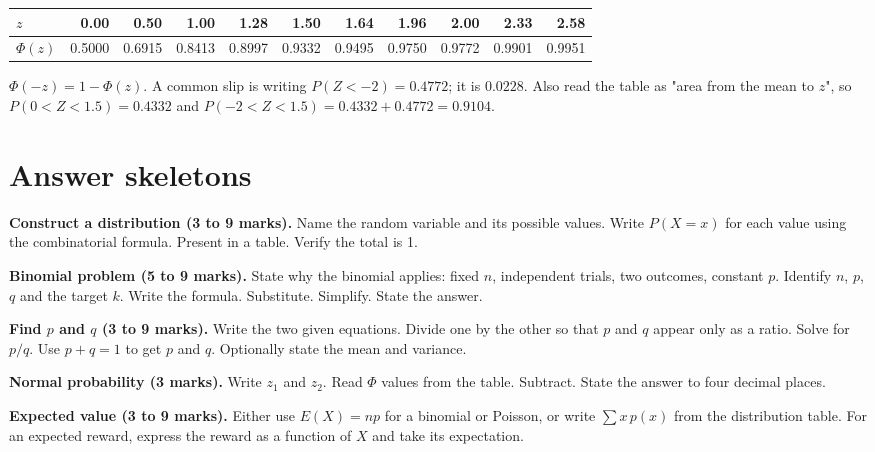 \documentclass[11pt,a4paper]{article}
\begin{document}
\begin{center}\small
\begin{tabular}{l|rrrrrrrrrr}
\toprule $z$ & 0.00 & 0.50 & 1.00 & 1.28 & 1.50 & 1.64 & 1.96 & 2.00 & 2.33 & 2.58\\\midrule
$\Phi(z)$ & 0.5000 & 0.6915 & 0.8413 & 0.8997 & 0.9332 & 0.9495 & 0.9750 & 0.9772 & 0.9901 & 0.9951\\\bottomrule
\end{tabular}
\end{center}

\begin{dangerbox}
$\Phi(-z)=1-\Phi(z)$. A common slip is writing $P(Z<-2)=0.4772$; it is $0.0228$. Also read the table as "area from the mean to $z$", so $P(0<Z<1.5)=0.4332$ and $P(-2<Z<1.5)=0.4332+0.4772=0.9104$.
\end{dangerbox}

\section{Answer skeletons}

\begin{answerbox}
\textbf{Construct a distribution (3 to 9 marks).} Name the random variable and its possible values. Write $P(X=x)$ for each value using the combinatorial formula. Present in a table. Verify the total is 1.
\end{answerbox}

\begin{answerbox}
\textbf{Binomial problem (5 to 9 marks).} State why the binomial applies: fixed $n$, independent trials, two outcomes, constant $p$. Identify $n$, $p$, $q$ and the target $k$. Write the formula. Substitute. Simplify. State the answer.
\end{answerbox}

\begin{answerbox}
\textbf{Find $p$ and $q$ (3 to 9 marks).} Write the two given equations. Divide one by the other so that $p$ and $q$ appear only as a ratio. Solve for $p/q$. Use $p+q=1$ to get $p$ and $q$. Optionally state the mean and variance.
\end{answerbox}

\begin{answerbox}
\textbf{Normal probability (3 marks).} Write $z_1$ and $z_2$. Read $\Phi$ values from the table. Subtract. State the answer to four decimal places.
\end{answerbox}

\begin{answerbox}
\textbf{Expected value (3 to 9 marks).} Either use $E(X)=np$ for a binomial or Poisson, or write $\sum x\,p(x)$ from the distribution table. For an expected reward, express the reward as a function of $X$ and take its expectation.
\end{answerbox}
\end{document}
